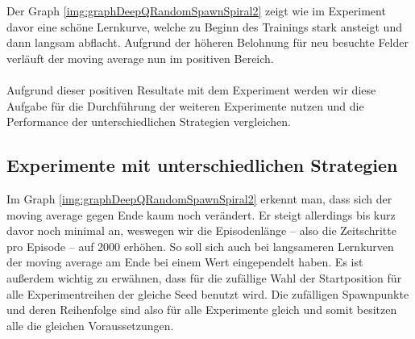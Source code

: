 Der Graph \ref{img:graphDeepQRandomSpawnSpiral2} zeigt wie im Experiment davor eine schöne Lernkurve, welche zu Beginn des Trainings stark ansteigt und dann langsam abflacht. Aufgrund der höheren Belohnung für neu besuchte Felder verläuft der moving average nun im positiven Bereich.

\paragraph{}
Aufgrund dieser positiven Resultate mit dem Experiment werden wir diese Aufgabe für die Durchführung der weiteren Experimente nutzen und die Performance der unterschiedlichen Strategien vergleichen.

% 

\subsection{Experimente mit unterschiedlichen Strategien}
Im Graph \ref{img:graphDeepQRandomSpawnSpiral2} erkennt man, dass sich der moving average gegen Ende kaum noch verändert. Er steigt allerdings bis kurz davor noch minimal an, weswegen wir die Episodenlänge -- also die Zeitschritte pro Episode -- auf 2000 erhöhen. So soll sich auch bei langsameren Lernkurven der moving average am Ende bei einem Wert eingependelt haben. Es ist außerdem wichtig zu erwähnen, dass für die zufällige Wahl der Startposition für alle Experimentreihen der gleiche Seed benutzt wird. Die zufälligen Spawnpunkte und deren Reihenfolge sind also für alle Experimente gleich und somit besitzen alle die gleichen Voraussetzungen.

